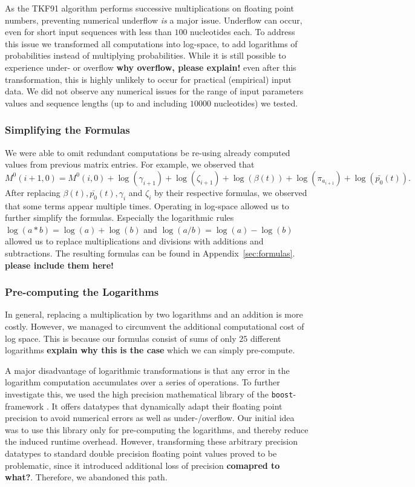 \documentclass[runningheads,a4paper]{llncs}
\begin{document}
As the TKF91 algorithm performs successive multiplications on floating point numbers, preventing numerical underflow
{\em is} a major issue. Underflow can occur, even for short input sequences with less than $100$ nucleotides each.
To address this issue we transformed all computations into log-space, to add logarithms of probabilities instead of multiplying probabilities.
While it is still possible to experience under- or overflow {\bf why overflow, please explain!} even after this transformation, 
this is highly unlikely to occur for practical (empirical) input data.
We did not observe any numerical issues for the range of input parameters values and sequence lengths (up to and including $10000$ nucleotides) 
we tested.

\subsubsection{Simplifying the Formulas}  
We were able to omit redundant computations be re-using already computed values from previous matrix entries.
For example, we observed that $$M^0(i+1,0) = M^0(i,0) + \log(\gamma_{i+1}) + \log(\zeta_{i+1}) + \log(\beta(t)) + \log(\pi_{a_{i+1}}) + \log(\bar{p_0}(t)).$$
After replacing $\beta(t), \bar{p_0}(t), \gamma_i$ and $\zeta_i$ by their respective formulas, we observed that some terms appear multiple times. 
Operating in log-space allowed us to further simplify the formulas. Especially the logarithmic rules $\log(a*b) = \log(a) + \log(b)$ and $\log(a/b) = \log(a) - \log(b)$ 
allowed us to replace multiplications and divisions with additions and subtractions.
The resulting formulas can be found in Appendix~\ref{sec:formulas}. {\bf please include them here!}

\subsubsection{Pre-computing the Logarithms}
In general, replacing a multiplication by two logarithms and an addition is more costly. 
However, we managed to circumvent the additional computational cost of log space. 
This is because our formulas consist of sums of only $25$ different logarithms {\bf explain why this is the case} which we can simply 
pre-compute.

A major disadvantage of logarithmic transformations is that any error in the logarithm computation accumulates over a series of operations. 
To further investigate this, we used the high precision mathematical library of the \texttt{boost}-framework \cite{boost}. 
It offers datatypes that dynamically adapt their floating point precision to avoid numerical errors as well as under-/overflow. 
Our initial idea was to use this library only for pre-computing the logarithms, and thereby reduce the induced runtime overhead. 
However, transforming these arbitrary precision datatypes to standard double precision floating point values proved to be problematic, since 
it introduced additional loss of precision {\bf comapred to what?}. Therefore,  we abandoned this path.
\end{document}
